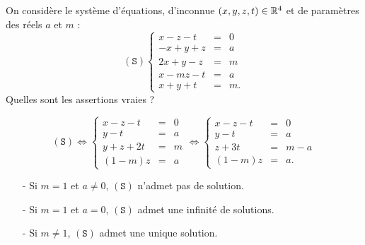 \begin{question}
On considère le système d'équations, d'inconnue $(x,y,z,t) \in \mathbb{R}^4$ et  de paramètres des réels  $a$ et $m$ : 
$$(\mathtt{S})  
\left\{\begin{array}{rcc}
x-z-t&=&0\\
-x+y+z&=&a\\ 
2x+y-z&=&m \\
x-mz-t&=&a \\
x+y+t&=&m.\end{array}\right.$$
Quelles sont les assertions vraies ?
\begin{answers}  
\end{answers}
\begin{explanations} 
$$(\mathtt{S}) \Leftrightarrow  
\left\{\begin{array}{rcc}
x-z-t&=&0\\
y-t&=&a\\ 
y+z+2t&=&m \\
(1-m)z&=&a \end{array}\right.
\Leftrightarrow  
\left\{\begin{array}{rcc}
x-z-t&=&0\\
y-t&=&a\\ 
z+3t&=&m-a \\
(1-m)z&=&a.\end{array}\right.$$
\begin{enumerate}
\item[-]Si $m=1$ et $a\neq 0$, $(\mathtt{S})$ n'admet pas  de solution.
\item[-]Si $m=1$ et $a= 0$, $(\mathtt{S})$ admet une infinité de solutions.
\item[-]Si $m\neq1$, $(\mathtt{S})$ admet une unique solution.
\end{enumerate}
\end{explanations}
\end{question}

